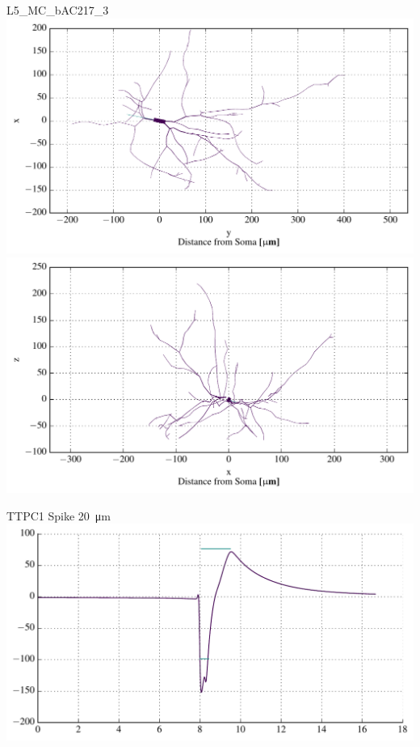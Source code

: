 \documentclass{beamer}
\begin{document}
\begin{frame}{L5\_MC\_bAC217\_3}{}
    \centering
    \includegraphics[height=0.4\textheight]{images/mc_morph_xy.pdf}\\
    \includegraphics[height=0.4\textheight]{images/mc_morph_xz.pdf}
\end{frame}


\begin{frame}{TTPC1 Spike \SI{20}{\micro\metre}}{}
    \centering
    \includegraphics[width=1.0\textwidth]{images/sym_elec_t_170_p_0_n_2.pdf}
\end{frame}
\end{document}
